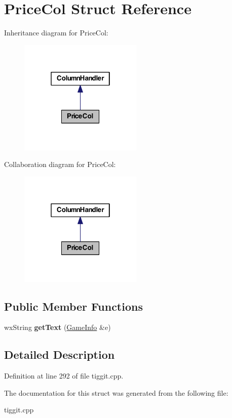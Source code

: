 \hypertarget{struct_price_col}{\section{Price\-Col Struct Reference}
\label{struct_price_col}
}


Inheritance diagram for Price\-Col\-:
\nopagebreak
\begin{figure}[H]
\begin{center}
\leavevmode
\includegraphics[width=166pt]{struct_price_col__inherit__graph}
\end{center}
\end{figure}


Collaboration diagram for Price\-Col\-:
\nopagebreak
\begin{figure}[H]
\begin{center}
\leavevmode
\includegraphics[width=166pt]{struct_price_col__coll__graph}
\end{center}
\end{figure}
\subsection*{Public Member Functions}
\begin{DoxyCompactItemize}
\item 
\hypertarget{struct_price_col_ad92d347be672e3f78fd8fb3786c67acd}{wx\-String {\bfseries get\-Text} (\hyperlink{struct_game_info}{Game\-Info} \&e)}\label{struct_price_col_ad92d347be672e3f78fd8fb3786c67acd}

\end{DoxyCompactItemize}


\subsection{Detailed Description}


Definition at line 292 of file tiggit.\-cpp.



The documentation for this struct was generated from the following file\-:\begin{DoxyCompactItemize}
\item 
tiggit.\-cpp\end{DoxyCompactItemize}
